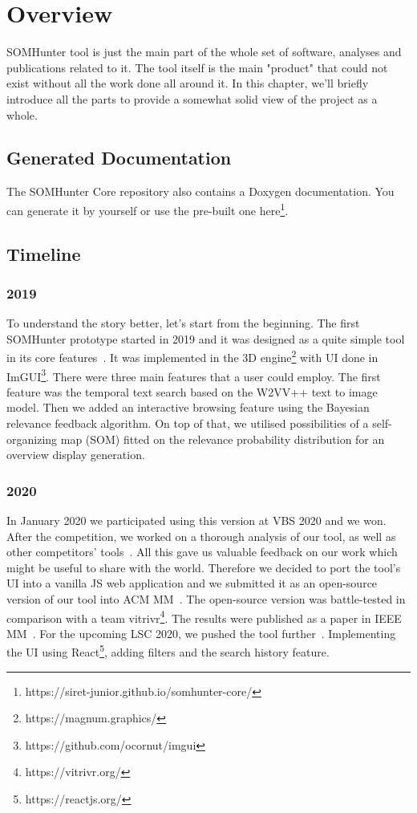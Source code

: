 \chapter{Overview}
\label{overview}

SOMHunter tool is just the main part of the whole set of software, analyses and publications related to it. The tool itself is the main "product" that could not exist without all the work done all around it. In this chapter, we'll briefly introduce all the parts to provide a somewhat solid view of the project as a whole.

\section{Generated Documentation}
The SOMHunter Core repository also contains a Doxygen documentation. You can generate it by yourself or use the pre-built one here\footnote{https://siret-junior.github.io/somhunter-core/}.

\section{Timeline}

\subsection{2019}
To understand the story better, let's start from the beginning. The first SOMHunter prototype started in 2019 and it was designed as a quite simple tool in its core features~\cite{kratochvil2020som}. It was implemented in the 3D engine\footnote{https://magnum.graphics/} with UI done in ImGUI\footnote{https://github.com/ocornut/imgui}. There were three main features that a user could employ. The first feature was the temporal text search based on the W2VV++ text to image model. Then we added an interactive browsing feature using the Bayesian relevance feedback algorithm. On top of that, we utilised possibilities of a self-organizing map (SOM) fitted on the relevance probability distribution for an overview display generation. 

\subsection{2020}
In January 2020 we participated using this version at VBS 2020 and we won. After the competition, we worked on a thorough analysis of our tool, as well as other competitors' tools~\cite{lokovc2021reign}. All this gave us valuable feedback on our work which might be useful to share with the world. Therefore we decided to port the tool's UI into a vanilla JS web application and we submitted it as an open-source version of our tool into ACM MM~\cite{kratochvil2020somhunter}. The open-source version was battle-tested in comparison with a team vitrivr\footnote{https://vitrivr.org/}. The results were published as a paper in IEEE MM~\cite{rosetto2021}. For the upcoming LSC 2020, we pushed the tool further~\cite{mejzlik2020somhunter}. Implementing the UI using React\footnote{https://reactjs.org/}, adding filters and the search history feature.


